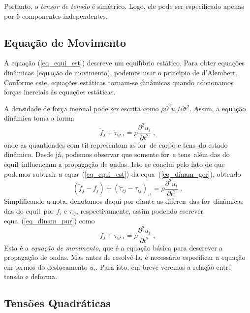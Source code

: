 Portanto, o {\it tensor de tens\~ao} \'e sim\'etrico. Logo, ele
pode ser especificado apenas por 6 componentes independentes.



\subsection{Equa\c{c}\~ao de Movimento}

A equa\c{c}\~ao (\ref{eq_equi_est}) descreve um equil\'{\i}brio
est\'atico. Para obter equa\c{c}\~oes din\^amicas
(equa\c{c}\~ao de movimento), podemos usar o princ\'{\i}pio de
d'Alembert. Conforme este, equa\c{c}\~oes est\'aticas tornam-se
din\^amicas quando adicionamos for\c{c}as inerciais \`as
equa\c{c}\~oes est\'aticas.

A densidade de for\c{c}a inercial pode ser escrita como $\rho
\partial^2u_i / \partial t^2$. Assim, a equa\c{c}\~ao din\^amica toma a
forma
\begin{equation}
\tilde{f}_j + \tilde{\tau}_{ij,i} = \rho \frac{
\partial^2u_i }{ \partial t^2 }\;,
\label{eq_dinam_ger}
\end{equation}
onde as quantidades com til representam as for\cas\ de corpo e tens\oes\ do
estado din\^amico. Desde j\'a, podemos observar que somente for\cas\ e
tens\oes\ al\'em das do equil\ibrio\ influenciam a propaga\c{c}\~ao de
ondas. Isto se conclui pelo fato de que podemos subtrair a equa\cao\
(\ref{eq_equi_est}) da equa\cao\ (\ref{eq_dinam_ger}), obtendo
\begin{equation}
(\tilde{f}_j -f_j) + (\tilde{\tau}_{ij}-\tau_{ij})_{,i} = \rho \frac{
\partial^2u_i }{ \partial t^2 }\;,
\label{eq_dinam_pur}
\end{equation}
Simplificando a nota\cao, denotamos daqui por diante as diferen\cas\ das
for\cas\ din\^amicas das do equil\ibrio\ por $f_i$ e $\tau_{ij}$,
respectivamente, assim podendo escrever equa\cao\ (\ref{eq_dinam_pur})
como
\begin{equation}
f_j + \tau_{ij,i} = \rho \frac{
\partial^2u_i }{ \partial t^2 }\;,
\label{eq_dinam}
\end{equation}
Esta \'e a {\it equa\c{c}\~ao de movimento}, que \'e a equa\c{c}\~ao
b\'asica para descrever a propaga\c{c}\~ao de ondas. Mas antes de
resolv\'e-la, \'e necess\'ario especificar a equa\c{c}\~ao em termos do
deslocamento $u_i$. Para isto, em breve veremos a
rela\c{c}\~ao entre tens\~ao e deforma\cao.



\subsection{Tens\~oes Quadr\'aticas}

